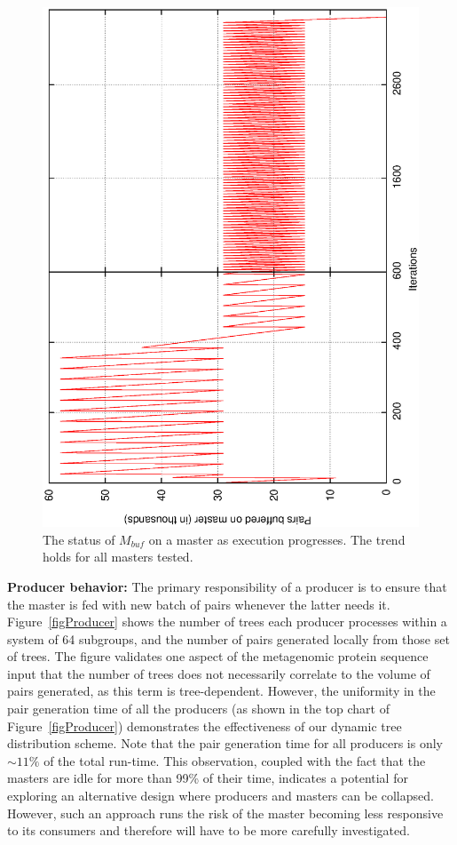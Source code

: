 \documentclass[10pt,journal,letterpaper,compsoc]{IEEEtran}
\begin{document}
\begin{figure}[thb]
\centerline{
						\includegraphics[angle=-90, scale=0.3]{Group.pBuf.eps}
            }
\caption{
The status of $M_{buf}$ on a master as execution progresses. The trend holds for all masters tested.
}
\label{figMBuffer}
\end{figure}

{\bf Producer behavior:} The primary responsibility of a producer is to ensure that the master is fed with new batch of pairs whenever the latter needs it.  Figure~\ref{figProducer} shows the number of trees each producer processes within a system of 64 subgroups, and the number of pairs generated locally from those set of trees. The figure validates one aspect of the metagenomic protein sequence input that the number of trees does not necessarily correlate to the volume of pairs generated, as this term is tree-dependent. However, the uniformity in the pair generation time of all the producers (as shown in the top chart of Figure~\ref{figProducer}) demonstrates the effectiveness of our dynamic tree distribution scheme. Note that the pair generation time for all producers is only $\sim 11\%$ of the total run-time. This observation, coupled with the fact that the masters are idle for more than 99\% of their time, indicates a potential for exploring an alternative design where producers and masters can be collapsed. However, such an approach runs the risk of the master becoming less responsive to its consumers and therefore will have to be more carefully investigated.
\end{document}
